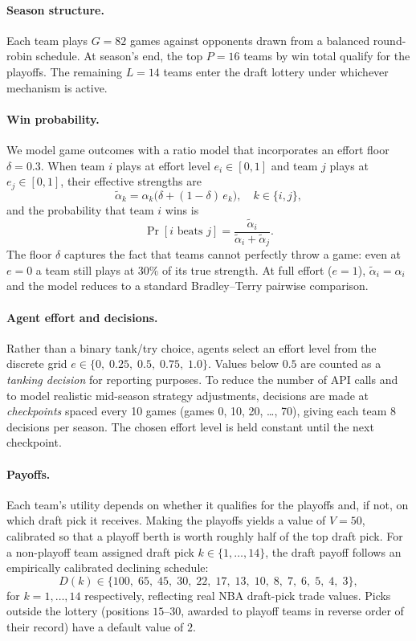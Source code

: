 \paragraph{Season structure.}
Each team plays $G = 82$ games against opponents drawn from a balanced
round-robin schedule.
At season's end, the top $P = 16$ teams by win total qualify for the playoffs.
The remaining $L = 14$ teams enter the draft lottery under whichever mechanism
is active.

\paragraph{Win probability.}
We model game outcomes with a ratio model that incorporates an effort floor
$\delta = 0.3$.
When team $i$ plays at effort level $e_i \in [0,1]$ and team $j$ plays at
$e_j \in [0,1]$, their effective strengths are
\[
    \tilde{\alpha}_k = \alpha_k \bigl(\delta + (1 - \delta)\, e_k\bigr),
    \quad k \in \{i, j\},
\]
and the probability that team $i$ wins is
\[
    \Pr[\text{$i$ beats $j$}]
    = \frac{\tilde{\alpha}_i}{\tilde{\alpha}_i + \tilde{\alpha}_j}.
\]
The floor $\delta$ captures the fact that teams cannot perfectly throw a game:
even at $e = 0$ a team still plays at $30\%$ of its true strength.
At full effort ($e = 1$), $\tilde{\alpha}_i = \alpha_i$ and the model reduces
to a standard Bradley--Terry pairwise comparison.

\paragraph{Agent effort and decisions.}
Rather than a binary tank/try choice, agents select an effort level from the
discrete grid $e \in \{0,\; 0.25,\; 0.5,\; 0.75,\; 1.0\}$.
Values below $0.5$ are counted as a \emph{tanking decision} for reporting
purposes.
To reduce the number of API calls and to model realistic mid-season strategy
adjustments, decisions are made at \emph{checkpoints} spaced every 10 games
(games 0, 10, 20, \ldots, 70), giving each team 8 decisions per season.
The chosen effort level is held constant until the next checkpoint.

\paragraph{Payoffs.}
Each team's utility depends on whether it qualifies for the playoffs and, if
not, on which draft pick it receives.
Making the playoffs yields a value of $V = 50$, calibrated so that a playoff
berth is worth roughly half of the top draft pick.
For a non-playoff team assigned draft pick $k \in \{1, \ldots, 14\}$, the
draft payoff follows an empirically calibrated declining schedule:
\[
    D(k) \in \{100,\; 65,\; 45,\; 30,\; 22,\; 17,\; 13,\; 10,\;
               8,\; 7,\; 6,\; 5,\; 4,\; 3\},
\]
for $k = 1, \ldots, 14$ respectively, reflecting real NBA draft-pick trade
values.
Picks outside the lottery (positions $15$--$30$, awarded to playoff teams in
reverse order of their record) have a default value of $2$.

